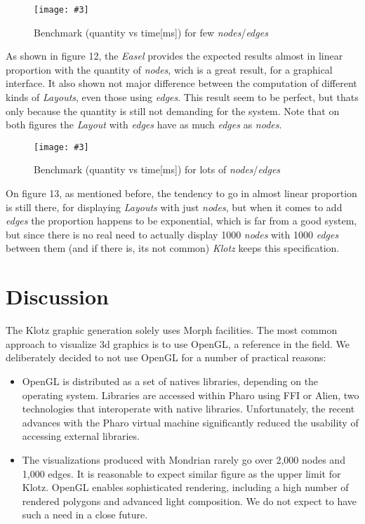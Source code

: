 \documentclass{sig-alternate}
\newcommand{\fig}[4]{
	\begin{figure}[#1]
		\centering
		\texttt{[image: \#3]}
		\caption{\label{fig:#3}#4}
	\end{figure}}
\newcommand{\seclabel}[1]{\label{sec:#1}}
\begin{document}
\fig{}{0.5}{graph1}{Benchmark (quantity vs time[ms]) for few \emph{nodes}/\emph{edges}} 

As shown in figure 12, the \emph{Easel} provides the expected results
almost in linear proportion with the quantity of \emph{nodes}, 
wich is a great result, for a graphical interface. It also shown 
not major difference between the computation of different kinds 
of \emph{Layouts}, even those using \emph{edges}. This result seem 
to be perfect, but thats only because the quantity is still not 
demanding for the system. Note that on both figures the \emph{Layout} 
with \emph{edges} have as much \emph{edges} as \emph{nodes}.  

\fig{}{0.5}{graph2}{Benchmark (quantity vs time[ms]) for lots of \emph{nodes}/\emph{edges}}

On figure 13, as mentioned before, the tendency to go in almost 
linear proportion is still there, for displaying \emph{Layouts} 
with just \emph{nodes}, but when it comes to add \emph{edges}
the proportion happens to be exponential, which is far from
a good system, but since there is no real need to actually 
display 1000 \emph{nodes} with 1000 \emph{edges} between them (and
if there is, its not common) \emph{Klotz} keeps this specification. 

\section{Discussion} \seclabel{discussion}

The Klotz graphic generation solely uses Morph facilities. The most common approach to visualize 3d graphics is to use OpenGL, a reference in the field. We deliberately decided to not use OpenGL for a number of practical reasons:

\begin{itemize}
\item OpenGL is distributed as a set of natives libraries, depending on the operating system. Libraries are accessed within Pharo using FFI or Alien, two technologies that interoperate with native libraries. Unfortunately, the recent advances with the Pharo virtual machine significantly reduced the usability of accessing external libraries.

\item The visualizations produced with Mondrian rarely go over 2,000 nodes and 1,000 edges. It is reasonable to expect similar figure as the upper limit for Klotz. OpenGL enables sophisticated rendering, including a high number of rendered polygons and advanced light composition. We do not expect to have such a need in a close future.
\end{itemize}
\end{document}
